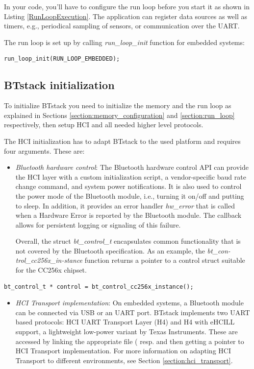 \documentclass[a4paper,titlepage,oneside,12pt]{amsart} %
\begin{document}
In your code, you'll have to configure the run loop before you start it as shown in Listing \ref{RunLoopExecution}. The application can register data sources as well as timers, e.g., periodical sampling of sensors, or communication over the UART.

The run loop is set up by calling \emph{run\_loop\_init} function for embedded systems:
\begin{lstlisting}
run_loop_init(RUN_LOOP_EMBEDDED);
\end{lstlisting}


\subsection{BTstack initialization}
\label{section:btstack_initialization}
To initialize BTstack you need to initialize the memory and the run loop as explained in Sections \ref{section:memory_configuration} and \ref{section:run_loop} respectively, then setup HCI and all needed higher level protocols.

The HCI initialization has to adapt BTstack to the used platform and requires four arguments. These are:
\begin{itemize}
\item \emph{Bluetooth hardware control}: The Bluetooth hardware control API can provide the HCI layer with a custom initialization script, a vendor-specific baud rate change command, and system power notifications. It is also used to control the power mode of the Bluetooth module, i.e., turning it on/off and putting to sleep. In addition, it provides an error handler \emph{hw\_error} that is called when a Hardware Error is reported by the Bluetooth module. The callback allows for persistent logging or signaling of this failure. 

Overall, the struct \emph{bt\_control\_t} encapsulates common functionality that is not covered by the Bluetooth specification. As an example, the \emph{bt\_con-trol\_cc256x\_in-stance} function returns a pointer to a control struct suitable for the CC256x chipset.
\end{itemize}

\begin{lstlisting}
bt_control_t * control = bt_control_cc256x_instance();
\end{lstlisting}

\begin{itemize}
\item \emph{HCI Transport implementation}: On embedded systems, a Bluetooth module can be connected via USB or an UART port. BTstack implements two UART based protocols: HCI UART Transport Layer (H4) and H4 with eHCILL support, a lightweight low-power variant by Texas Instruments.
These are accessed by linking the appropriate file ( resp.  and then getting a pointer to HCI Transport implementation. For more information on adapting HCI Transport to different environments, see Section \ref{section:hci_transport}.
\end{itemize}
\end{document}
